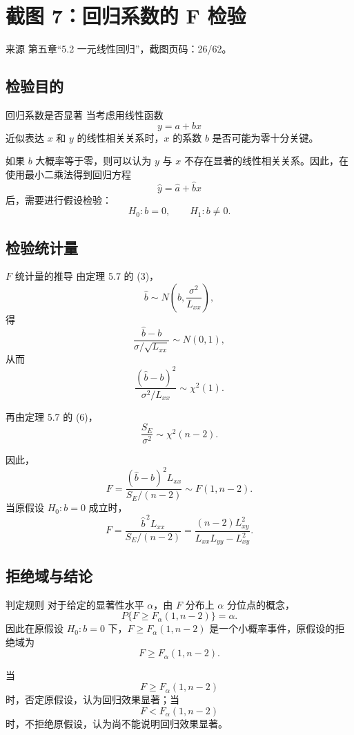 \documentclass[UTF8,zihao=-4,fontset=fandol]{ctexart}
\begin{document}
\section{截图 7：回归系数的 F 检验}

\begin{sourcebox}{来源}
第五章“5.2 一元线性回归”，截图页码：26/62。
\end{sourcebox}

\subsection{检验目的}

\begin{keybox}{回归系数是否显著}
当考虑用线性函数
\[
y=a+bx
\]
近似表达 $x$ 和 $y$ 的线性相关关系时，$x$ 的系数 $b$ 是否可能为零十分关键。

如果 $b$ 大概率等于零，则可以认为 $y$ 与 $x$ 不存在显著的线性相关关系。因此，在使用最小二乘法得到回归方程
\[
\hat{y}=\hat{a}+\hat{b}x
\]
后，需要进行假设检验：
\[
H_0:b=0,\qquad H_1:b\ne 0.
\]
\end{keybox}

\subsection{检验统计量}

\begin{keybox}{$F$ 统计量的推导}
由定理 5.7 的 (3)，
\[
\hat{b}\sim N\left(b,\frac{\sigma^2}{L_{xx}}\right),
\]
得
\[
\frac{\hat{b}-b}{\sigma/\sqrt{L_{xx}}}\sim N(0,1),
\]
从而
\[
\frac{(\hat{b}-b)^2}{\sigma^2/L_{xx}}\sim \chi^2(1).
\]

再由定理 5.7 的 (6)，
\[
\frac{S_E}{\sigma^2}\sim \chi^2(n-2).
\]

因此，
\[
F=
\frac{(\hat{b}-b)^2L_{xx}}{S_E/(n-2)}
\sim F(1,n-2).
\]
当原假设 $H_0:b=0$ 成立时，
\[
F=
\frac{\hat{b}^{\,2}L_{xx}}{S_E/(n-2)}
=
\frac{(n-2)L_{xy}^{2}}{L_{xx}L_{yy}-L_{xy}^{2}}.
\]
\end{keybox}

\subsection{拒绝域与结论}

\begin{methodbox}{判定规则}
对于给定的显著性水平 $\alpha$，由 $F$ 分布上 $\alpha$ 分位点的概念，
\[
P\{F\ge F_{\alpha}(1,n-2)\}=\alpha.
\]
因此在原假设 $H_0:b=0$ 下，$F\ge F_{\alpha}(1,n-2)$ 是一个小概率事件，原假设的拒绝域为
\[
F\ge F_{\alpha}(1,n-2).
\]

当
\[
F\ge F_{\alpha}(1,n-2)
\]
时，否定原假设，认为回归效果显著；当
\[
F< F_{\alpha}(1,n-2)
\]
时，不拒绝原假设，认为尚不能说明回归效果显著。
\end{methodbox}
\end{document}
